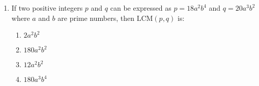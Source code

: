 \begin{enumerate}
\item If two positive integers $p$ and $q$ can be expressed as $p = 18a^2 b^4$ and $q = 20a^3 b^2$ where $a$ and $b$ are prime numbers, then $\text{LCM}(p, q)$ is:
	\begin{enumerate}    
\item $2a^2 b^2$
    \item $180a^2 b^2$
    \item $12a^2  b^2$
    \item $180a^3 b^4$
	\end{enumerate}
\end{enumerate}
